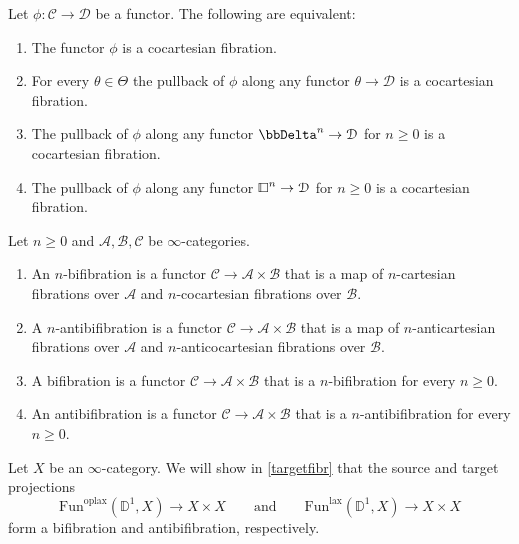 \documentclass[10pt,oneside]{article}
\numberwithin{equation}{section} %
\numberwithin{figure}{section} %
\theoremstyle{plain}
\theoremstyle{definition}
\newcommand{\bD}{{\mathbb D}}
\newcommand{\mA}{{\mathcal A}}
\newcommand{\mB}{{\mathcal B}}
\newcommand{\mC}{{\mathcal C}}
\newcommand{\mD}{{\mathcal D}}
\newcommand{\Fun}{\mathrm{Fun}}
\newcommand{\lax}{{\mathrm{lax}}}
\newcommand{\oplax}{{\mathrm{oplax}}}
\newcommand{\cube}{{\,\vline\negmedspace\square}}
\begin{document}
\begin{corollary}\label{thetalocal} Let $\phi: \mC \to \mD$ be a functor.
The following are equivalent:

\begin{enumerate}[\normalfont(1)]\setlength{\itemsep}{-2pt}
\item The functor $\phi$ is a cocartesian fibration.

\item For every $\theta \in \Theta$ the pullback of $\phi$ along any functor $\theta \to \mD$ is a cocartesian fibration.

\item The pullback of $\phi$ along any functor $\bbDelta^n \to \mD$
for $n \geq 0 $ is a cocartesian fibration.

\item The pullback of $\phi$ along any functor $\cube^n \to \mD$
for $n \geq 0 $ is a cocartesian fibration.

\end{enumerate}

\end{corollary}



\begin{definition}

Let $ n \geq 0 $ and $\mA,\mB,\mC$ be $\infty$-categories.

\begin{enumerate}[\normalfont(1)]\setlength{\itemsep}{-2pt}
\item An $n$-bifibration 
is a functor $\mC \to \mA \times \mB $ that is a map of $n$-cartesian fibrations over $\mA$ and $n$-cocartesian fibrations over $\mB.$


\item A $n$-antibifibration 
is a functor $\mC \to \mA \times \mB $ that is a map of $n$-anticartesian fibrations over $\mA$ and $n$-anticocartesian fibrations over $\mB.$

\item A bifibration 
is a functor $\mC \to \mA \times \mB $ that is a $n$-bifibration for every $n \geq 0.$

\item An antibifibration 
is a functor $\mC \to \mA \times \mB $ that is a $n$-antibifibration for every $n \geq 0.$
\end{enumerate}

\end{definition}

\begin{remark}
Let $X$ be an $\infty$-category.
We will show in \cref{targetfibr} that the source and target projections
\[
\Fun^{\oplax}(\bD^1,X)\to X\times X\qquad\text{and}\qquad \Fun^{\lax}(\bD^1,X)\to X\times X
\]
form a bifibration and antibifibration, respectively.
\end{remark}
\end{document}
